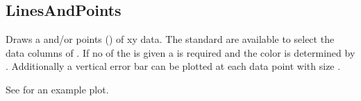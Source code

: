\subsection{LinesAndPoints}\label{plotGraphLayerType:linesAndPoints}
Draws a  and/or points ()
of xy data. The standard 
are available to select the data columns of .
If no  of the 
is given a 
is required and the color is determined by .
Additionally a vertical error bar can be plotted at each data point with
size .

See  for an example plot.


